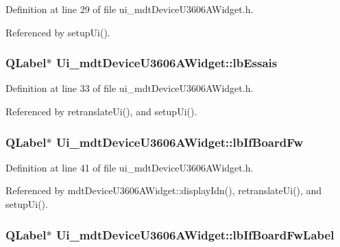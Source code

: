 Definition at line 29 of file ui\-\_\-mdt\-Device\-U3606\-A\-Widget.\-h.



Referenced by setup\-Ui().

\hypertarget{class_ui__mdt_device_u3606_a_widget_ac7d0f6c08fc5a943d234225a56079867}{
\subsubsection[{lb\-Essais}]{\setlength{\rightskip}{0pt plus 5cm}Q\-Label$\ast$ Ui\-\_\-mdt\-Device\-U3606\-A\-Widget\-::lb\-Essais}}\label{class_ui__mdt_device_u3606_a_widget_ac7d0f6c08fc5a943d234225a56079867}


Definition at line 33 of file ui\-\_\-mdt\-Device\-U3606\-A\-Widget.\-h.



Referenced by retranslate\-Ui(), and setup\-Ui().

\hypertarget{class_ui__mdt_device_u3606_a_widget_af7898574daf7278c6eedbcfabc4dd715}{
\subsubsection[{lb\-If\-Board\-Fw}]{\setlength{\rightskip}{0pt plus 5cm}Q\-Label$\ast$ Ui\-\_\-mdt\-Device\-U3606\-A\-Widget\-::lb\-If\-Board\-Fw}}\label{class_ui__mdt_device_u3606_a_widget_af7898574daf7278c6eedbcfabc4dd715}


Definition at line 41 of file ui\-\_\-mdt\-Device\-U3606\-A\-Widget.\-h.



Referenced by mdt\-Device\-U3606\-A\-Widget\-::display\-Idn(), retranslate\-Ui(), and setup\-Ui().

\hypertarget{class_ui__mdt_device_u3606_a_widget_ad11e8aded543cc1eeaaaf3e6753089d3}{
\subsubsection[{lb\-If\-Board\-Fw\-Label}]{\setlength{\rightskip}{0pt plus 5cm}Q\-Label$\ast$ Ui\-\_\-mdt\-Device\-U3606\-A\-Widget\-::lb\-If\-Board\-Fw\-Label}}\label{class_ui__mdt_device_u3606_a_widget_ad11e8aded543cc1eeaaaf3e6753089d3}


